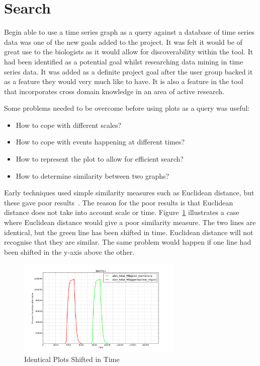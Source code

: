 \section{Search}
\label{sec:search}

Begin able to use a time series graph as a query against a database of time series data was one of the new goals added to the project.  It was felt it would be of great use to the biologists as it would allow for discoverability within the tool.  It had been identified as a potential goal whilst researching data mining in time series data.  It was added as a definite project goal after the user group backed it as a feature they would very much like to have.  It is also a feature in the tool that incorporates cross domain knowledge in an area of active research.

Some problems needed to be overcome before using plots as a query was useful:
\begin{itemize}
\item How to cope with different scales?
\item How to cope with events happening at different times?
\item How to represent the plot to allow for efficient search?
\item How to determine similarity between two graphs?
\end{itemize}

Early techniques used simple similarity measures such as Euclidean distance, but these gave poor results~\cite{chotirat}.  The reason for the poor results is that Euclidean distance does not take into account scale or time.  Figure~\ref{fig:similar} illustrates a case where Euclidean distance would give a poor similarity measure.  The two lines are identical, but the green line has been shifted in time.  Euclidean distance will not recognise that they are similar.  The same problem would happen if one line had been shifted in the y-axis above the other.

\begin{figure}[h!]
    \centering
    \includegraphics[width=0.7\textwidth]{images/similar_plots.png}
    \caption{Identical Plots Shifted in Time}
    \label{fig:similar}
\end{figure}

